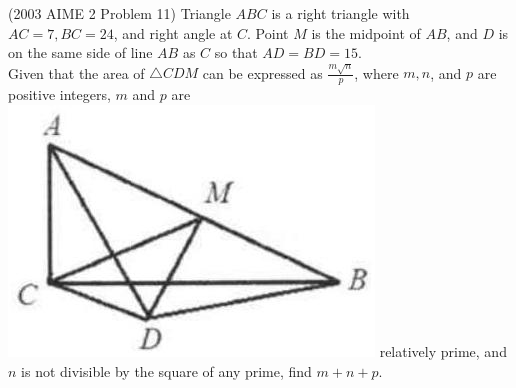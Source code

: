 \documentclass{article}
\begin{document}
(2003 AIME 2 Problem 11) Triangle \(A B C\) is a right triangle with \(A C=7, B C=24\), and right angle at \(C\). Point \(M\) is the midpoint of \(A B\), and \(D\) is on the same side of line \(A B\) as \(C\) so that \(A D=B D=15\).\\
Given that the area of \(\triangle C D M\) can be expressed as \(\frac{m \sqrt{n}}{p}\), where \(m, n\), and \(p\) are positive integers, \(m\) and \(p\) are\\
\includegraphics[width=\textwidth]{images/086.jpg} relatively prime, and \(n\) is not divisible by the square of any prime, find \(m+n+p\).
\end{document}
